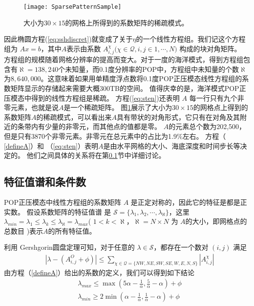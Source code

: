 \begin{figure}
\centering
\texttt{[image: SparsePatternSample]}
\caption[] {大小为$30\times 15$的网格上所得到的系数矩阵的稀疏模式。 \label{fig:spy}}
\end{figure}
因此椭圆方程(\ref{eq:sshdiscret})就变成了关于$\eta$的一个线性方程组。我们记这个方程组为 $Ax= b$，其中$A$表示由系数 $A_{i,j}^{\chi } ( \chi \in \mathcal{Q}, i,j \in {1,\cdots, N)}$ 构成的块对角矩阵。
方程组的规模随着网格分辨率的提高而变大。对于一度的海洋模式，得到方程组包含有$\aleph = 138,240$个未知量，而0.1度分辨率的POP中，方程组中未知量的个数$\aleph$ 为$8,640,000$。这意味着如果用单精度浮点数将0.1度POP正压模态线性方程组的系数矩阵显示的存储起来需要大概300TB的空间。
值得庆幸的是，海洋模式POP正压模态中得到的线性方程组是稀疏。
方程(\ref{eq:sten})还表明 $A$ 每一行只有九个非零元素，也就是说$A$是一个稀疏矩阵。 图\ref{fig:spy}展示了大小为$30\times 15$的网格点上得到的系数矩阵$A$的稀疏模式，可以看出来$A$具有带状的对角形式，它只有在对角及其附近的条带内有少量的非零元，而其他点的值都是零。
$A$的元素总个数为202,500，但是只有3870个非零元素。非零元在总元素中的占比为1.9\%左右。
方程（ \ref{defineA}）和 （\ref{eq:sten}）表明$A$是由水平网格的大小、海底深度和时间步长等决定的。
他们之间具体的关系将在第\ref{solver:Algorithm:condition}节中详细讨论。

\subsection{特征值谱和条件数}
\label{solver:Algorithm:condition}

POP正压模态中线性方程组的系数矩阵 $A$ 是正定对称的\cite{smith2010parallel}，因此它的特征是都是正实数\cite{stewart1976positive}。
假设系数矩阵的特征值谱\cite{golub2012matrix} 是 $\mathcal{S} = \{\lambda_1, \lambda_2, \cdots, \lambda_\aleph\}$，这里 $\lambda_{min} = \lambda_1 \le \lambda_k \le \lambda_\aleph = \lambda_{max}$( $1<k <\aleph $，$\aleph=N\times N$ 为 $A$的大小，即网格点的总数目 )表示$A$的所有特征值。

利用 Gershgorin圆盘定理\cite{bell1965gershgorin}可知，对于任意的 $\lambda \in \mathcal{S}$，都存在一个数对 $(i,j)$ 满足
\begin{align}
&|\lambda -  (A_{i,j}^O + \phi ) | \le \sum_{\chi \in \mathcal{Q} = \{NW,NE,SW,SE,W,E,N,S\}}|A_{i,j}^\chi|
\end{align}
由方程（\ref{defineA}）给出的系数的定义，我们可以得到如下结论 
\begin{align} \label{eigsGersh}
&\lambda_{max} \le  \max (  5\alpha - \frac{1}{\alpha}, \frac{5}{\alpha}- \alpha) +\phi   \\
&\lambda_{min} \ge 2\min (  \alpha - \frac{1}{\alpha},\frac{1} {\alpha} -  \alpha) + \phi
\end{align}

